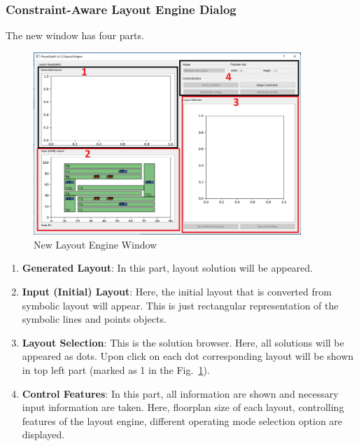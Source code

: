 \documentclass[11pt]{article}
\begin{document}
\subsubsection{Constraint-Aware Layout Engine Dialog}
\label{sec-2-6-1}
The new window has four parts.
\begin{figure}[h]
\centering

\includegraphics[width=0.9\textwidth]{./figs/new_dialog.PNG}
\caption{New Layout Engine Window}
\label{new_dialog}
\end{figure}
\begin{enumerate}
    \item \textbf{Generated Layout}: In this part, layout solution will be appeared.
    \item  \textbf{Input (Initial) Layout}: Here, the initial layout that is converted from symbolic layout will appear. This is just rectangular representation of the symbolic lines and points objects.
    \item  \textbf{Layout Selection}: This is the solution browser. Here, all solutions will be appeared as dots. Upon click on each dot corresponding layout will be shown in top left part (marked as 1 in the Fig.~\ref{new_dialog}).
    \item  \textbf{Control Features}: In this part, all information are shown and necessary input information are taken. Here, floorplan size of each layout, controlling features of the layout engine, different operating mode selection option are displayed.
\end{enumerate}
\end{document}
